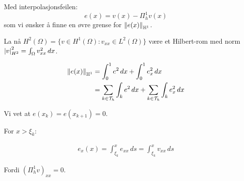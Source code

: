 Med interpolasjonsfeilen:
\[
	e(x) = v(x) - \Pi_h^1 v(x)
\]
som vi ønsker å finne en øvre grense for \(\norm*{e(x)}_{\mathbb{H}^1} \).

La nå $H^2(\Omega) = \{v \in H^1(\Omega) : v_{xx} \in L^2(\Omega)\}$ være et Hilbert-rom med norm $\abs*{v}_{H^2}^2 = \int_\Omega v_{xx}^2 \, dx$.

\begin{align*}
	\norm*{e(x)}_{\mathbb{H}^1} & = \int_0^1 e^2 \, dx + \int_0^1 e_x^2 \, dx                                                   \\
	                            & = \sum_{k\in\mathcal{T}_h} \int_{k} e^2 \, dx + \sum_{k\in\mathcal{T}_h} \int_{k} e_x^2 \, dx
\end{align*}

Vi vet at $e(x_k) = e(x_{k+1}) = 0$.

For $x > \xi_k$:

\begin{align*}
	e_x(x) = \int_{\xi_k}^x e_{xx} \, ds = \int_{\xi_k}^x v_{xx} \, ds
\end{align*}

Fordi $(\Pi_h^1 v)_{xx} = 0$.

